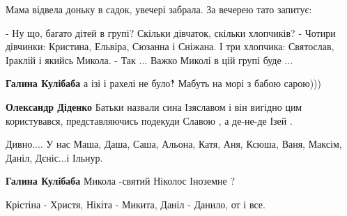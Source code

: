 \begin{itemize}
Мама відвела доньку в садок, увечері забрала. За вечерею тато запитує:

\obeycr
- Ну що, багато дітей в групі? Скільки дівчаток, скільки хлопчиків?
- Чотири дівчинки: Кристина, Ельвіра, Сюзанна і Сніжана. І три хлопчика: Святослав, Іраклій і якийсь Микола.
- Так ... Важко Миколі в цій групі буде ...
\restorecr

\begin{itemize}
 
\textbf{Галина Кулібаба} а ізі і рахелі не було‽
Мабуть на морі з бабою сарою)))

 
\textbf{Олександр Діденко}
Батьки назвали сина Ізяславом і він вигідно цим користувався, представляючись подекуди Славою , а де-не-де Ізей .

 
Дивно.... У нас Маша, Даша, Саша, Альона, Катя, Аня, Ксюша, Ваня, Максім, Даніл, Дєніс...і Ільнур.

 
\textbf{Галина Кулібаба} Микола -святий Ніколос
Іноземне ?

 
Крістіна - Христя, Нікіта - Микита, Даніл - Данило, от і все.


\end{itemize}
\end{itemize}
